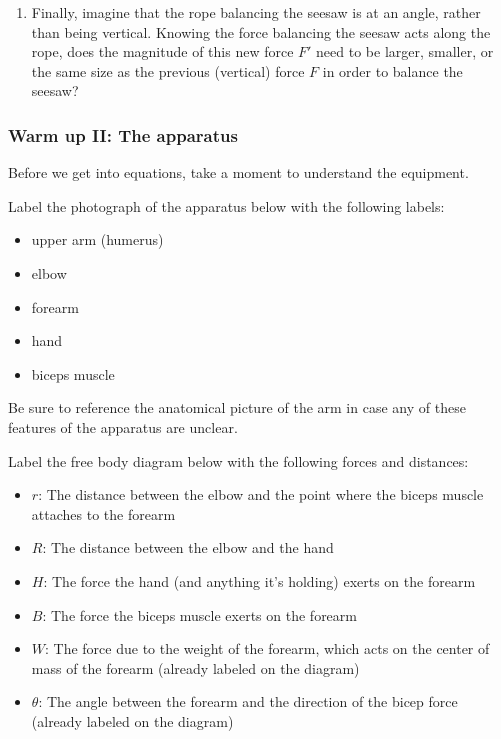 \begin{enumerate}[label={\arabic*.},ref=\textcolor{black}{\arabic*}]
\item \label{q:angle-rope}
	Finally, imagine that the rope balancing the seesaw
	is at an angle, rather than being vertical.
	Knowing the force balancing the seesaw acts along the rope,
	does the magnitude of this new force $F'$ need to be 
	larger, smaller, or the same size as the previous (vertical) force $F$
	in order to balance the seesaw?

	\end{enumerate}

\subsubsection*{Warm up II: The apparatus}
Before we get into equations, take a moment to understand the equipment.  
\enumb
\item
	Label the photograph of the apparatus below with the following labels:

\begin{itemize}
	\item upper arm (humerus)
	\item elbow 
	\item forearm 
	\item hand
	\item biceps muscle
\end{itemize}
	Be sure to reference the anatomical picture of the arm in case
	any of these features of the apparatus are unclear.
\item
	Label the free body diagram below with the following forces and distances:
\begin{itemize}
	\item $r$:  The distance between the elbow 
		and the point where the biceps muscle attaches to the forearm
	\item $R$:	The distance between the elbow and the hand
	\item $H$:  The force the hand (and anything it's holding) 
		exerts on the forearm
	\item $B$:	The force the biceps muscle exerts on the forearm
	\item $W$:  The force due to the weight of the forearm,
		which acts on the center of mass of the forearm
		(already labeled on the diagram)
	\item $\theta$:  The angle between the forearm 
		and the direction of the bicep force
		(already labeled on the diagram)
\end{itemize}

